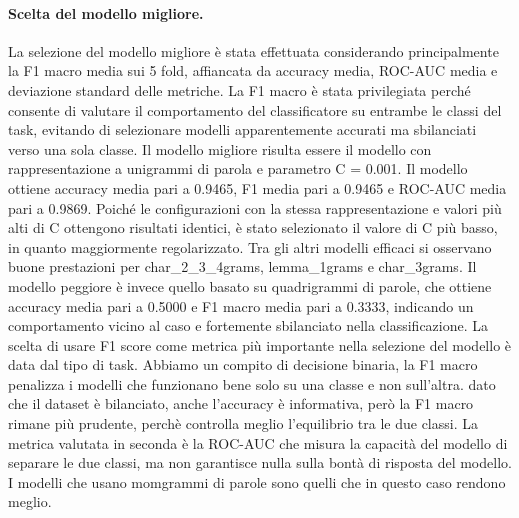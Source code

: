 \documentclass[a4paper,12pt]{report}
\begin{document}
    \paragraph{Scelta del modello migliore.} La selezione del modello migliore è stata effettuata considerando principalmente la F1 macro media sui 5 fold, affiancata da accuracy media, ROC-AUC media e deviazione standard delle metriche. La F1 macro è stata privilegiata perché consente di valutare il comportamento del classificatore su entrambe le classi del task, evitando di selezionare modelli apparentemente accurati ma sbilanciati verso una sola classe. Il modello migliore risulta essere il modello con rappresentazione a unigrammi di parola e parametro C = 0.001. Il modello ottiene accuracy media pari a 0.9465, F1 media pari a 0.9465 e ROC-AUC media pari a 0.9869. Poiché le configurazioni con la stessa rappresentazione e valori più alti di C ottengono risultati identici, è stato selezionato il valore di C più basso, in quanto maggiormente regolarizzato. Tra gli altri modelli efficaci si osservano buone prestazioni per char\_2\_3\_4grams, lemma\_1grams e char\_3grams. Il modello peggiore è invece quello basato su quadrigrammi di parole, che ottiene accuracy media pari a 0.5000 e F1 macro media pari a 0.3333, indicando un comportamento vicino al caso e fortemente sbilanciato nella classificazione.
    La scelta di usare F1 score come metrica più importante nella selezione del modello è data dal tipo di task. Abbiamo un compito di decisione binaria, la F1 macro penalizza i modelli che funzionano bene solo su una classe e non sull'altra. dato che il dataset è bilanciato, anche l'accuracy è informativa, però la F1 macro rimane più prudente, perchè controlla meglio l'equilibrio tra le due classi. La metrica valutata in seconda è la ROC-AUC che misura la capacità del modello di separare le due classi, ma non garantisce nulla sulla bontà di risposta del modello. I modelli che usano momgrammi di parole sono quelli che in questo caso rendono meglio.
\end{document}
